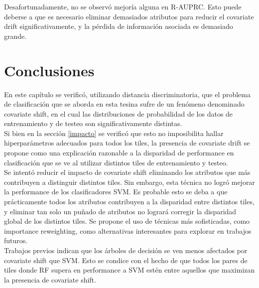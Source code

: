 Desafortunadamente, no se observó mejoría alguna en R-AUPRC. Esto puede deberse a que es necesario eliminar demasiados atributos para reducir el covariate drift significativamente, y la pérdida de información asociada es demasiado grande. 


\section{Conclusiones}

En este capítulo se verificó, utilizando distancia discriminatoria, que el problema de clasificación que se aborda en esta tesina sufre de un fenómeno denominado covariate shift, en el cual las distribuciones de probabilidad de los datos de entrenamiento y de testeo son significativamente distintas. \\

Si bien en la sección \ref{impacto} se verificó que esto no imposibilita hallar hiperparámetros adecuados para todos los tiles, la presencia de covariate drift se propone como una explicación razonable a la disparidad de performance en clasificación que se ve al utilizar distintos tiles de entrenamiento y testeo. \\

Se intentó reducir el impacto de covariate shift eliminando los atributos que más contribuyen a distinguir distintos tiles. Sin embargo, esta técnica no logró mejorar la performance de los clasificadores SVM. Es probable esto se deba a que prácticamente todos los atributos contribuyen a la disparidad entre distintos tiles, y eliminar tan solo un puñado de atributos no logrará corregir la disparidad global de los distintos tiles. Se propone el uso de técnicas más sofisticadas, como importance reweighting, como alternativas interesantes para explorar en trabajos futuros. \\

Trabajos previos indican que los árboles de decisión se ven menos afectados por covariate shift que SVM. Esto se condice con el hecho de que todos los pares de tiles donde RF supera en performance a SVM estén entre aquellos que maximizan la presencia de covariate shift.